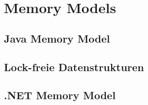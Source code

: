 
\section{Memory Models}
\subsection{Java Memory Model}
\subsection{Lock-freie Datenstrukturen}
\subsection{.NET Memory Model}